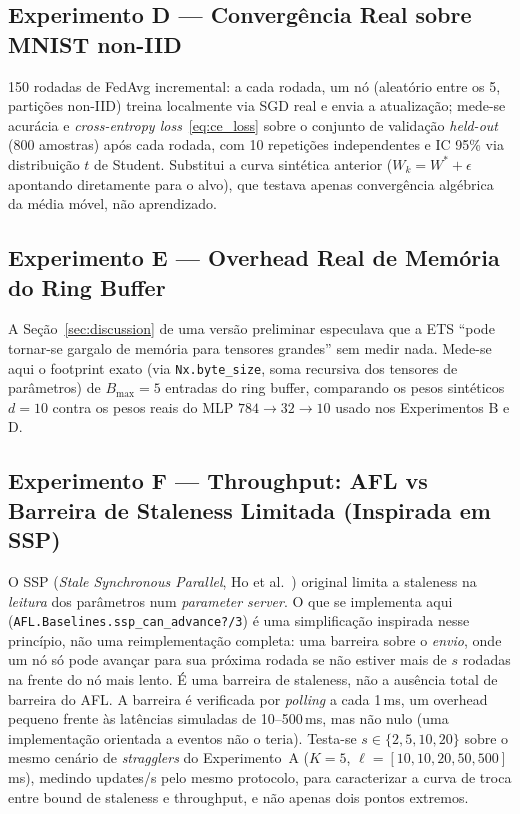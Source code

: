 \documentclass[conference,a4paper]{IEEEtran}
\begin{document}
\subsection{Experimento D --- Convergência Real sobre MNIST non-IID}

150 rodadas de FedAvg incremental: a cada rodada, um nó (aleatório entre os
5, partições non-IID) treina localmente via SGD real e envia a atualização;
mede-se acurácia e \textit{cross-entropy loss}~\eqref{eq:ce_loss} sobre o
conjunto de validação \textit{held-out} (800 amostras) após cada rodada, com
10 repetições independentes e IC 95\% via distribuição $t$ de Student.
Substitui a curva sintética anterior ($W_k = W^*+\epsilon$ apontando
diretamente para o alvo), que testava apenas convergência algébrica da
média móvel, não aprendizado.

\subsection{Experimento E --- Overhead Real de Memória do Ring Buffer}

A Seção~\ref{sec:discussion} de uma versão preliminar especulava que a ETS
``pode tornar-se gargalo de memória para tensores grandes'' sem medir nada.
Mede-se aqui o footprint exato (via \texttt{Nx.byte\_size}, soma recursiva
dos tensores de parâmetros) de $B_{\max}=5$ entradas do ring buffer,
comparando os pesos sintéticos $d=10$ contra os pesos reais do MLP
$784\!\to\!32\!\to\!10$ usado nos Experimentos B e D.

\subsection{Experimento F --- Throughput: AFL vs Barreira de Staleness Limitada (Inspirada em SSP)}
\label{sec:exp_f}

O SSP (\textit{Stale Synchronous Parallel}, Ho et al.~\cite{ho2013}) original
limita a staleness na \emph{leitura} dos parâmetros num \textit{parameter
server}. O que se implementa aqui (\texttt{AFL.Baselines.ssp\_can\_advance?/3})
é uma simplificação inspirada nesse princípio, não uma reimplementação
completa: uma barreira sobre o \emph{envio}, onde um nó só pode avançar
para sua próxima rodada se não estiver mais de $s$ rodadas na frente do nó
mais lento. É uma barreira de staleness, não a ausência total de barreira
do AFL. A barreira é verificada por \textit{polling} a cada 1\,ms, um
overhead pequeno frente às latências simuladas de 10--500\,ms, mas não
nulo (uma implementação orientada a eventos não o teria). Testa-se
$s \in \{2, 5, 10, 20\}$ sobre o mesmo cenário de \textit{stragglers} do
Experimento~A ($K=5$, $\ell=[10,10,20,50,500]$\,ms), medindo updates/s pelo
mesmo protocolo, para caracterizar a curva de troca entre bound de
staleness e throughput, e não apenas dois pontos extremos.
\end{document}
